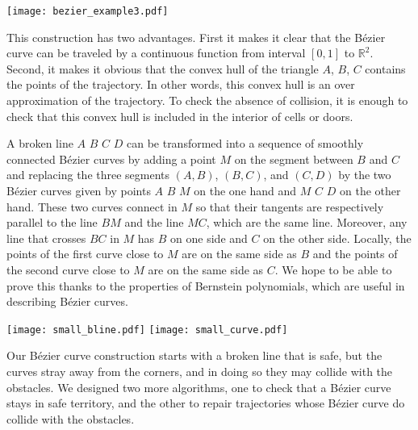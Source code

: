 \documentclass{easychair}
\begin{document}
\begin{center}
\texttt{[image: bezier\_example3.pdf]}
\end{center}

This construction has two advantages.  First it makes it clear that
the Bézier curve can be traveled by a continuous function from
interval \([0,1]\) to \({\mathbb R}^2\).  Second,
it makes it obvious that the convex hull of
the triangle \(A\), \(B\), \(C\) contains the points of the
trajectory.  In other words, this convex hull is an over approximation of
the trajectory.  To check the absence of collision, it is enough to check that
this convex hull is included in the interior of cells or doors.

A broken line \(A\) \(B\) \(C\) \(D\) can be transformed into a sequence
of smoothly connected Bézier
curves by adding a point \(M\) on the segment between \(B\) and \(C\)
and replacing the three segments \((A, B)\), \((B, C)\), and \((C,
D)\) by the two Bézier curves given by points \(A\) \(B\) \(M\) on the
one hand and \(M\) \(C\) \(D\) on the other hand.  These two curves
connect in \(M\) so that their tangents are respectively parallel to
the line \(BM\) and the line \(MC\), which are the same line.  Moreover,
any line that crosses \(BC\) in \(M\) has \(B\) on one side and \(C\) on the
other side.  Locally, the points of the first curve close to \(M\) are on the
same side as \(B\) and the points of the second curve close to \(M\) are on
the same side as \(C\).  We hope to be able to prove this thanks to the
properties of Bernstein polynomials, which are useful in describing 
Bézier curves.

\begin{center}
\texttt{[image: small\_bline.pdf]}
\texttt{[image: small\_curve.pdf]}
\end{center}

Our Bézier curve construction starts with a broken line that is safe,
but the curves stray away from the corners, and in doing so they may
collide with the obstacles.  We designed two more algorithms, one to check
that a Bézier curve stays in safe territory, and the other to repair
trajectories whose Bézier curve do collide with the obstacles.
\end{document}
